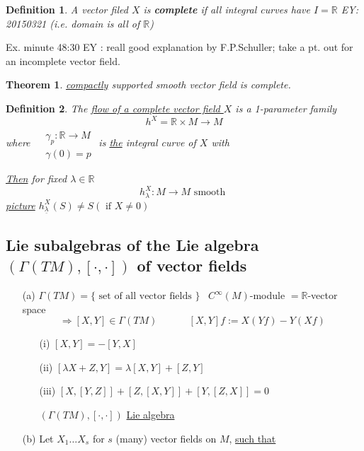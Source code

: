 \documentclass[10pt]{amsart}
\newtheorem{theorem}{Theorem}
\newtheorem{definition}{Definition}
\begin{document}
\begin{multicols*}{2}
	\begin{definition} A vector filed $X$ is \textbf{complete} if all integral curves have $I = \mathbb{R}$ EY: 20150321 (i.e. domain is all of $\mathbb{R}$)
	\end{definition}
	
	Ex. minute 48:30 EY : reall good explanation by F.P.Schuller; take a pt. out for an incomplete vector field.
	
	\begin{theorem}
		\underline{compactly} supported smooth vector field is complete.  
	\end{theorem}
	
	\begin{definition} The \underline{flow of a complete vector field $X$} is a 1-parameter family
		\[
		h^X = \mathbb{R}\times M \to M
		\]
		where $\begin{aligned} & \quad \\ 
		& \gamma_p : \mathbb{R} \to M \\
		& \gamma(0) = p \end{aligned}$ is \underline{the} integral curve of $X$ with 
		
		\underline{Then} for fixed $\lambda \in \mathbb{R}$ 
		\[
		h_{\lambda}^X : M \to M \text{ smooth }
		\]
		\underline{picture}  $h^X_{\underline{\lambda}}(S) \neq S (\text{ if } X \neq 0 )$
	\end{definition}
	
	\subsection{Lie subalgebras of the Lie algebra $(\Gamma(TM) , [ \cdot , \cdot ] )$ of vector fields}
	
	\begin{enumerate}
		\item[(a)] $\Gamma(TM) = \lbrace \text{ set of all vector fields } \rbrace$ \quad \, $C^{\infty}(M)$-module $ = \mathbb{R}$-vector space \[
		\Longrightarrow [X,Y] \in \Gamma(TM) \quad \quad \quad \, [X,Y] f := X(Yf) - Y(Xf)
		\]
		\begin{enumerate}
			\item[(i)] $[X,Y] = -[Y,X]$ 
			\item[(ii)] $[\lambda X + Z, Y] = \lambda [X,Y] + [Z,Y]$
			\item[(iii)] $[X,[Y,Z]]  + [Z,[X,Y]] + [Y,[Z,X]] =0$ 
			
			$(\Gamma(TM), [\cdot, \cdot])$ \underline{Lie algebra}
		\end{enumerate}
		\item[(b)] Let $X_1\dots X_s$ for $s$ (many) vector fields on $M$, \underline{such that}
	\end{enumerate}
	

\end{multicols*}
\end{document}
